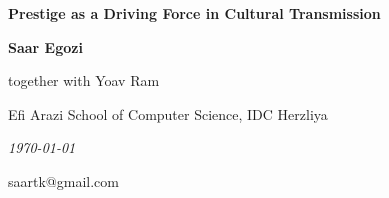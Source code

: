 \documentclass[11pt]{article}
\author{
	Dr. Yoav Ram
	\and
	Saar Egozi
}
\begin{document}
\begin{titlepage}
\centering

\vspace{4cm}

{\LARGE\bfseries Prestige as a Driving Force in Cultural Transmission}

\vspace{2cm}

{\large\bfseries Saar Egozi}

\vspace{1cm}

{\large together with Yoav Ram}

\vspace{2cm}

\vfill

{\large Efi Arazi School of Computer Science, IDC Herzliya}

\vspace{1cm}

{\itshape \today}

{\large saartk@gmail.com}
\end{titlepage}


\renewcommand\linenumberfont{\normalfont\small\sffamily}
\linenumbers
\modulolinenumbers[2]
\setcounter{secnumdepth}{0}
\tableofcontents

\clearpage

\end{document}
